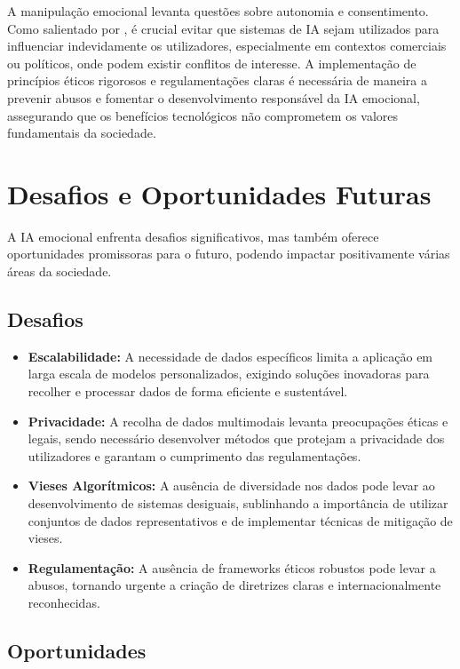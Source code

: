 \documentclass[a4paper,12pt]{report}
\begin{document}
	A manipulação emocional levanta questões sobre autonomia e consentimento. Como salientado por \textcite{haidt2001}, é crucial evitar que sistemas de IA sejam utilizados para influenciar indevidamente os utilizadores, especialmente em contextos comerciais ou políticos, onde podem existir conflitos de interesse. A implementação de princípios éticos rigorosos e regulamentações claras é necessária de maneira a prevenir abusos e fomentar o desenvolvimento responsável da IA emocional, assegurando que os benefícios tecnológicos não comprometem os valores fundamentais da sociedade.
	
	\section{Desafios e Oportunidades Futuras}
	
	A IA emocional enfrenta desafios significativos, mas também oferece oportunidades promissoras para o futuro, podendo impactar positivamente várias áreas da sociedade.
	
	\subsection{Desafios}
	
	\begin{itemize} \item \textbf{Escalabilidade:} A necessidade de dados específicos limita a aplicação em larga escala de modelos personalizados, exigindo soluções inovadoras para recolher e processar dados de forma eficiente e sustentável. \item \textbf{Privacidade:} A recolha de dados multimodais levanta preocupações éticas e legais, sendo necessário desenvolver métodos que protejam a privacidade dos utilizadores e garantam o cumprimento das regulamentações. \item \textbf{Vieses Algorítmicos:} A ausência de diversidade nos dados pode levar ao desenvolvimento de sistemas desiguais, sublinhando a importância de utilizar conjuntos de dados representativos e de implementar técnicas de mitigação de vieses. \item \textbf{Regulamentação:} A ausência de frameworks éticos robustos pode levar a abusos, tornando urgente a criação de diretrizes claras e internacionalmente reconhecidas. \end{itemize}
	
	\subsection{Oportunidades}
	
\end{document}
